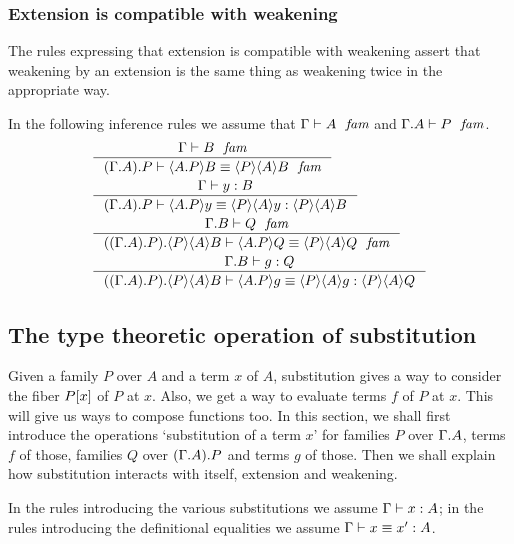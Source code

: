 \subsubsection{Extension is compatible with weakening}\label{comp-ew}
The rules expressing that extension is compatible with weakening assert that
weakening by an extension is the same thing as weakening twice in the
appropriate way.

In the following inference rules we assume that
$\jfam{\Gamma}{A}$ and $\jfam{\ctxext{\Gamma}{A}}{P}$. 
\begin{align}
& \inference{\jfam{\Gamma}{B}}
    {\jfameq{\ctxext{{\Gamma}{A}}{P}}{\ctxwk{\ctxext{A}{P}}{B}}{\ctxwk{P}{{A}{B}}}}\\
& \inference{\jterm{\Gamma}{B}{y}}
    {\jtermeq{\ctxext{{\Gamma}{A}}{P}}{\ctxwk{P}{{A}{B}}}{\ctxwk{\ctxext{A}{P}}{y}}{\ctxwk{P}{{A}{y}}}}\\
& \inference{\jfam{\ctxext{\Gamma}{B}}{Q}}
    {\jfameq{\ctxext{{{\Gamma}{A}}{P}}{\ctxwk{P}{{A}{B}}}}{\ctxwk{\ctxext{A}{P}}{Q}}{\ctxwk{P}{{A}{Q}}}}\\
& \inference{\jterm{\ctxext{\Gamma}{B}}{Q}{g}}
    {\jtermeq{\ctxext{{{\Gamma}{A}}{P}}{\ctxwk{P}{{A}{B}}}}{\ctxwk{P}{{A}{Q}}}{\ctxwk{\ctxext{A}{P}}{g}}{\ctxwk{P}{{A}{g}}}}
\end{align}

\subsection{The type theoretic operation of substitution}
Given a family $P$ over $A$ and a term $x$ of $A$, substitution gives a way to
consider the fiber $\subst{x}{P}$ of $P$ at $x$. Also, we get a way to evaluate
terms $f$ of $P$ at $x$. This will give us ways to compose functions too. In
this section, we shall first introduce the operations `substitution of a term $x$'
for families $P$ over $\ctxext{\Gamma}{A}$, terms $f$ of those, families $Q$ over
$\ctxext{{\Gamma}{A}}{P}$ and terms $g$ of those. 
Then we shall explain how substitution interacts
with itself, extension and weakening.

In the rules introducing the various substitutions we assume $\jterm{\Gamma}{A}{x}$;
in the rules introducing the definitional equalities we assume $\jtermeq{\Gamma}{A}{x}{x'}$.

